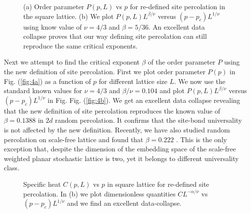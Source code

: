 \documentclass[twocolumn,showpacs,preprintnumbers,amsmath,amssymb]{article}
\begin{document}
\begin{figure}

\centering



\subfloat[]
{
\label{fig:4a}
}

\subfloat[]
{
\label{fig:4b}
}
\caption{(a) Order parameter $P(p,L)$ vs $p$ for re-defined site percolation in the square lattice. 
(b) We plot $P(p,L)L^{\beta/\nu}$ versus $(p-p_c)L^{1/\nu}$ using know value of $\nu=4/3$ and $\beta=5/36$. 
An excellent data collapse proves that our way defining site percolation can still reproduce the
same critical exponents. 
} 

\label{fig:4ab}
\end{figure}




Next we attempt to find the critical exponent $\beta$ of the order parameter $P$ using 
the new definition of site percolation.
First we plot order parameter $P(p)$ in Fig. (\ref{fig:4a})  as a function of $p$ for different
lattice size $L$. We now use the
standard known values for $\nu=4/3$ and $\beta/\nu=0.104$ and plot  $P(p,L)L^{\beta/\nu}$ versus
$(p-p_c)L^{1/\nu}$ in Fig.  Fig. (\ref{fig:4b}). We get an excellent data collapse revealing that the new definition of site
percolation reproduces the known value of $\beta=0.1388$ in $2d$ random percolation. 
It confirms that the site-bond universality
is not affected by the new definition. Recently, we have also studied random percolation 
on scale-free lattice and found that $\beta=0.222$ 
\cite{ref.Hassan_Rahman_1}. 
This is the only exception that, despite the dimension of the embedding space of the scale-free weighted planar stochastic lattice is two, yet it belongs to different universality class. 




\begin{figure}

\centering



\subfloat[]
{
\label{fig:5a}
}

\subfloat[]
{
\label{fig:5b}
}
\caption{Specific heat $C(p,L)$ vs $p$ in square lattice for re-defined site percolation. 
 In (b) we plot dimensionless quantities $CL^{-\alpha/\nu}$ vs $(p-p_c)L^{1/\nu}$ and we find an excellent data-collapse.
} 

\label{fig:5ab}
\end{figure}
\end{document}
